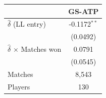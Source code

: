 \begin{tabular}{lc}
\toprule
 & GS-ATP \\
\midrule
$\hat{\delta}$ (LL entry) & -0.1172$^{**}$ \\
 & (0.0492) \\
$\hat{\delta}$ $\times$ Matches won & 0.0791 \\
 & (0.0545) \\
\midrule
Matches & 8,543 \\
Players & 130 \\
\bottomrule
\end{tabular}
